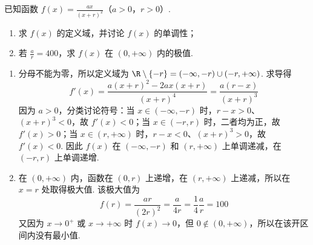 \begin{problem}
已知函数 \(f(x) = \frac{ax}{(x + r)^2}\)（\(a > 0\)，\(r > 0\)）.
\begin{enumerate}
\item 求 \( f(x) \) 的定义域，并讨论 \( f(x) \) 的单调性；
\item 若 \(\frac{a}{r} = 400\)，求 \(f(x)\) 在 \((0, +\infty)\) 内的极值.
\end{enumerate}
\end{problem}

\begin{solution}
\begin{enumerate}
\item 分母不能为零，所以定义域为 \(\R\setminus\{-r\}=(-\infty,-r)\cup(-r,+\infty)\). 求导得
\[
f'(x)=\frac{a(x+r)^2-2ax(x+r)}{(x+r)^4}=\frac{a(r-x)}{(x+r)^3}
\]
因为 \(a>0\)，分类讨论符号：当 \(x\in(-\infty,-r)\) 时，\(r-x>0\)、\((x+r)^3<0\)，故 \(f'(x)<0\)；当 \(x\in(-r,r)\) 时，二者均为正，故 \(f'(x)>0\)；当 \(x\in(r,+\infty)\) 时，\(r-x<0\)、\((x+r)^3>0\)，故 \(f'(x)<0\). 因此 \(f(x)\) 在 \((-\infty,-r)\) 和 \((r,+\infty)\) 上单调递减，在 \((-r,r)\) 上单调递增.
\item 在 \((0,+\infty)\) 内，函数在 \((0,r)\) 上递增，在 \((r,+\infty)\) 上递减，所以在 \(x=r\) 处取得极大值. 该极大值为
\[
f(r)=\frac{ar}{(2r)^2}=\frac{a}{4r}=\frac14\frac ar=100
\]
又因为 \(x\to0^+\) 或 \(x\to+\infty\) 时 \(f(x)\to0\)，但 \(0\notin(0,+\infty)\)，所以在该开区间内没有最小值.
\end{enumerate}
\end{solution}
